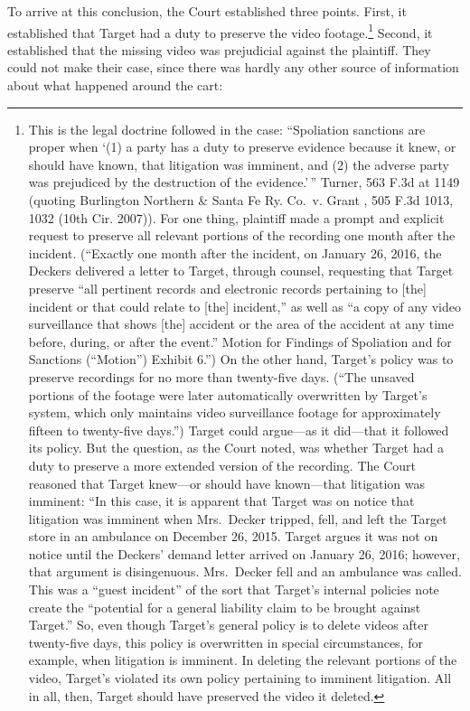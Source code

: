 \documentclass[
  10pt,
  dvipsnames,enabledeprecatedfontcommands]{scrartcl}
\begin{document}
To arrive at this conclusion, the Court established three points. First,
it established that Target had a duty to preserve the video
footage.\footnote{This is the legal doctrine followed in the case:
  ``Spoliation sanctions are proper when `(1) a party has a duty to
  preserve evidence because it knew, or should have known, that
  litigation was imminent, and (2) the adverse party was prejudiced by
  the destruction of the evidence.'\,'' Turner, 563 F.3d at 1149
  (quoting Burlington Northern \& Santa Fe Ry. Co.~v. Grant , 505 F.3d
  1013, 1032 (10th Cir. 2007)). For one thing, plaintiff made a prompt
  and explicit request to preserve all relevant portions of the
  recording one month after the incident. (``Exactly one month after the
  incident, on January 26, 2016, the Deckers delivered a letter to
  Target, through counsel, requesting that Target preserve ``all
  pertinent records and electronic records pertaining to {[}the{]}
  incident or that could relate to {[}the{]} incident,'' as well as ``a
  copy of any video surveillance that shows {[}the{]} accident or the
  area of the accident at any time before, during, or after the event.''
  Motion for Findings of Spoliation and for Sanctions (``Motion'')
  Exhibit 6.'') On the other hand, Target's policy was to preserve
  recordings for no more than twenty-five days. (``The unsaved portions
  of the footage were later automatically overwritten by Target's
  system, which only maintains video surveillance footage for
  approximately fifteen to twenty-five days.'') Target could argue---as
  it did---that it followed its policy. But the question, as the Court
  noted, was whether Target had a duty to preserve a more extended
  version of the recording. The Court reasoned that Target knew---or
  should have known---that litigation was imminent: ``In this case, it
  is apparent that Target was on notice that litigation was imminent
  when Mrs.~Decker tripped, fell, and left the Target store in an
  ambulance on December 26, 2015. Target argues it was not on notice
  until the Deckers' demand letter arrived on January 26, 2016; however,
  that argument is disingenuous. Mrs.~Decker fell and an ambulance was
  called. This was a ``guest incident'' of the sort that Target's
  internal policies note create the ``potential for a general liability
  claim to be brought against Target.'' So, even though Target's general
  policy is to delete videos after twenty-five days, this policy is
  overwritten in special circumstances, for example, when litigation is
  imminent. In deleting the relevant portions of the video, Target's
  violated its own policy pertaining to imminent litigation. All in all,
  then, Target should have preserved the video it deleted.} Second, it
established that the missing video was prejudicial against the
plaintiff. They could not make their case, since there was hardly any
other source of information about what happened around the cart:
\end{document}
